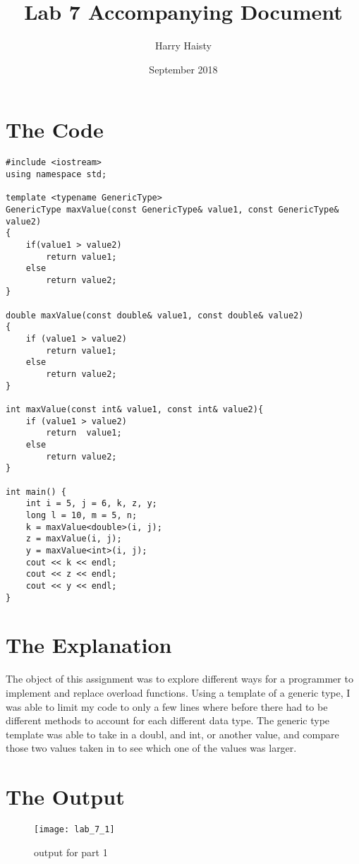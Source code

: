 \documentclass[11pt]{article}
\title{Lab 7  Accompanying Document}
\author{Harry Haisty}
\date{September 2018}
\begin{document}
\maketitle

\section*{The Code}
\begin{lstlisting}
#include <iostream>
using namespace std;

template <typename GenericType>
GenericType maxValue(const GenericType& value1, const GenericType& value2)
{
    if(value1 > value2)
        return value1;
    else
        return value2;
}

double maxValue(const double& value1, const double& value2)
{
    if (value1 > value2)
        return value1;
    else
        return value2;
}

int maxValue(const int& value1, const int& value2){
    if (value1 > value2)
        return  value1;
    else
        return value2;
}

int main() {
    int i = 5, j = 6, k, z, y;
    long l = 10, m = 5, n;
    k = maxValue<double>(i, j);
    z = maxValue(i, j);
    y = maxValue<int>(i, j);
    cout << k << endl;
    cout << z << endl;
    cout << y << endl;
}
\end{lstlisting}

\section*{The Explanation}
The object of this assignment was to explore different ways for a programmer to implement and replace overload functions. Using a template of a generic type, I was able to limit my code to only a few lines where before there had to be different methods to account for each different data type. 
The generic type template was able to take in a doubl, and int, or another value, and compare those two values taken in to see which one of the values was larger. 

\section*{The Output}
\begin{figure}[h]
\centering
\texttt{[image: lab\_7\_1]}
\caption {output for part 1}
\end{figure}
\end{document}
